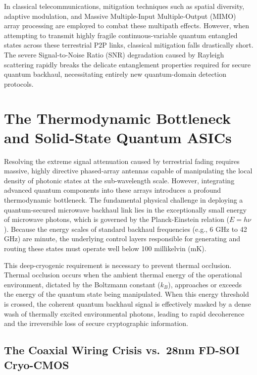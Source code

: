 \documentclass[11pt,a4paper]{article}
\begin{document}
In classical telecommunications, mitigation techniques such as spatial diversity, adaptive modulation, and Massive Multiple-Input Multiple-Output (MIMO) array processing are employed to combat these multipath effects.\cite{ref30} However, when attempting to transmit highly fragile continuous-variable quantum entangled states across these terrestrial P2P links, classical mitigation falls drastically short. The severe Signal-to-Noise Ratio (SNR) degradation caused by Rayleigh scattering rapidly breaks the delicate entanglement properties required for secure quantum backhaul, necessitating entirely new quantum-domain detection protocols.\cite{ref33}

\section{The Thermodynamic Bottleneck and Solid-State Quantum ASICs}

Resolving the extreme signal attenuation caused by terrestrial fading requires massive, highly directive phased-array antennas capable of manipulating the local density of photonic states at the sub-wavelength scale.\cite{ref6} However, integrating advanced quantum components into these arrays introduces a profound thermodynamic bottleneck. The fundamental physical challenge in deploying a quantum-secured microwave backhaul link lies in the exceptionally small energy of microwave photons, which is governed by the Planck-Einstein relation ($E = h\nu$).\cite{ref6} Because the energy scales of standard backhaul frequencies (e.g., 6 GHz to 42 GHz) are minute, the underlying control layers responsible for generating and routing these states must operate well below 100 millikelvin (mK).\cite{ref5}

This deep-cryogenic requirement is necessary to prevent thermal occlusion.\cite{ref6} Thermal occlusion occurs when the ambient thermal energy of the operational environment, dictated by the Boltzmann constant ($k_B$), approaches or exceeds the energy of the quantum state being manipulated.\cite{ref6} When this energy threshold is crossed, the coherent quantum backhaul signal is effectively masked by a dense wash of thermally excited environmental photons, leading to rapid decoherence and the irreversible loss of secure cryptographic information.\cite{ref6}

\subsection{The Coaxial Wiring Crisis vs.\ 28nm FD-SOI Cryo-CMOS}
\end{document}
